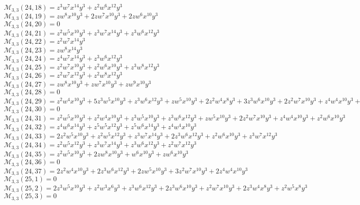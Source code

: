 \documentclass[12pt]{memoireuqam1.3}
\begin{document}
$\mathcal{M}_{3,3}(24,18)=z^3w^7x^{14}y^3+z^2w^6x^{12}y^3$\\
$\mathcal{M}_{3,3}(24,19)=zw^8x^{10}y^3+2zw^7x^{10}y^3+2zw^6x^{10}y^3$\\
$\mathcal{M}_{3,3}(24,20)=0$\\
$\mathcal{M}_{3,3}(24,21)=z^2w^5x^{10}y^3+z^3w^7x^{14}y^3+z^3w^6x^{12}y^3$\\
$\mathcal{M}_{3,3}(24,22)=z^2w^7x^{14}y^3$\\
$\mathcal{M}_{3,3}(24,23)=zw^8x^{14}y^3$\\
$\mathcal{M}_{3,3}(24,24)=z^4w^7x^{14}y^3+z^3w^6x^{12}y^3$\\
$\mathcal{M}_{3,3}(24,25)=z^2w^7x^{10}y^3+z^2w^6x^{10}y^3+z^3w^8x^{12}y^3$\\
$\mathcal{M}_{3,3}(24,26)=z^2w^7x^{12}y^3+z^2w^8x^{12}y^3$\\
$\mathcal{M}_{3,3}(24,27)=zw^8x^{10}y^3+zw^7x^{10}y^3+zw^9x^{10}y^3$\\
$\mathcal{M}_{3,3}(24,28)=0$\\
$\mathcal{M}_{3,3}(24,29)=z^2w^4x^{10}y^3+5z^3w^5x^{10}y^3+z^3w^6x^{12}y^3+zw^5x^{10}y^3+2z^2w^4x^8y^3+3z^3w^6x^{10}y^3+2z^2w^7x^{10}y^3+z^4w^4x^{10}y^3+z^2w^5x^8y^3$\\
$\mathcal{M}_{3,3}(24,30)=0$\\
$\mathcal{M}_{3,3}(24,31)=z^2w^5x^{10}y^3+z^2w^4x^{10}y^3+z^3w^5x^{10}y^3+z^3w^6x^{12}y^3+zw^5x^{10}y^3+2z^2w^7x^{10}y^3+z^4w^4x^{10}y^3+z^2w^6x^{10}y^3$\\
$\mathcal{M}_{3,3}(24,32)=z^4w^6x^{14}y^3+z^5w^5x^{12}y^3+z^5w^6x^{14}y^3+z^4w^4x^{10}y^3$\\
$\mathcal{M}_{3,3}(24,33)=2z^2w^5x^{10}y^3+z^2w^5x^{12}y^3+z^3w^7x^{14}y^3+2z^3w^6x^{12}y^3+z^2w^6x^{10}y^3+z^3w^7x^{12}y^3$\\
$\mathcal{M}_{3,3}(24,34)=z^2w^5x^{12}y^3+z^3w^7x^{14}y^3+z^3w^6x^{12}y^3+z^2w^7x^{12}y^3$\\
$\mathcal{M}_{3,3}(24,35)=z^2w^5x^{10}y^3+2zw^8x^{10}y^3+w^6x^{10}y^3+zw^6x^{10}y^3$\\
$\mathcal{M}_{3,3}(24,36)=0$\\
$\mathcal{M}_{3,3}(24,37)=2z^2w^4x^{10}y^3+2z^3w^6x^{12}y^3+2zw^5x^{10}y^3+3z^2w^7x^{10}y^3+2z^4w^4x^{10}y^3$\\
$\mathcal{M}_{3,3}(25,1)=0$\\
$\mathcal{M}_{3,3}(25,2)=2z^3w^5x^{10}y^3+z^2w^3x^6y^3+z^3w^6x^{12}y^3+2z^3w^6x^{10}y^3+z^2w^7x^{10}y^3+2z^3w^4x^8y^3+z^2w^5x^8y^3$\\
$\mathcal{M}_{3,3}(25,3)=0$\\
\end{document}
